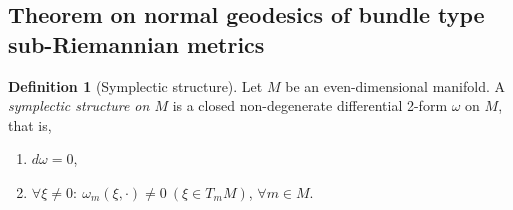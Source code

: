 \documentclass [xcolor=svgnames, t] {beamer}
\theoremstyle{definition}
\newtheorem{df}{Definition}
\theoremstyle{plain}
\theoremstyle{remark}
\begin{document}
\subsection{Theorem on normal geodesics of bundle type sub-Riemannian metrics}%
\label{sub:theorem_on_normal_geodesics_of_bundle_type_sub_riemannian_metrics}
\begin{frame}
	
\begin{df}[Symplectic structure]
	Let $ M $ be an even-dimensional manifold. A \textit{symplectic structure on $ M $ } is a closed non-degenerate differential 2-form $ \omega $ on $ M $, that is, 
	\begin{enumerate}
		\item $ d\omega=0 $,
		\item $\forall \xi \neq 0: \ \omega_m(\xi,\cdot)\neq0 \ (\xi\in T_m M)$, $ \forall m \in M. $  
	  

\end{enumerate}
\end{df}
\end{frame}
\end{document}
